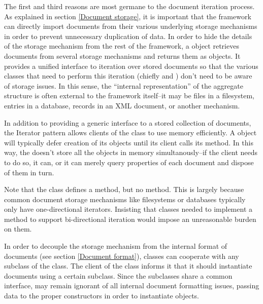 \documentclass[a4paper]{report}
\begin{document}
The first and third reasons are most germane to the document iteration
process.  As explained in section \ref{Document storage}, it is
important that the framework can directly import documents from their
various underlying storage mechanisms in order to prevent unnecessary
duplication of data.  In order to hide the details of the storage
mechanism from the rest of the framework, a  object
retrieves documents from several storage mechanisms and returns them
as  objects.  It provides a unified interface to iteration
over stored documents so that the various classes that need to perform
this iteration (chiefly  and ) don't need to be
aware of storage issues.  In this sense, the ``internal
representation'' of the aggregate structure is often external to the
framework itself--it may be files in a filesystem, entries in a
database, records in an XML document, or another mechanism.

In addition to providing a generic interface to a stored collection of
documents, the Iterator pattern allows clients of the  class
to use memory efficiently.  A  object will typically defer
creation of its  objects until its client calls its
 method.  In this way, the  doesn't store all
the  objects in memory simultanously--if the client needs to do so,
it can, or it can merely query properties of each document and dispose
of them in turn.

Note that the  class defines a  method,
but no  method.  This is largely because common
document storage mechanisms like filesystems or databases typically
only have one-directional iterators.  Insisting that
 classes needed to implement a 
method to support bi-directional iteration would impose an
unreasonable burden on them.

In order to decouple the storage mechanism from the internal format of
documents (see section \ref{Document format}), 
classes can cooperate with any subclass of the  class.
The client of the  class informs it that it should
instantiate documents using a certain  subclass.
Since the  subclasses share a common interface, 
may remain ignorant of all internal document formatting issues,
passing data to the proper constructors in order to instantiate
 objects.
\end{document}
